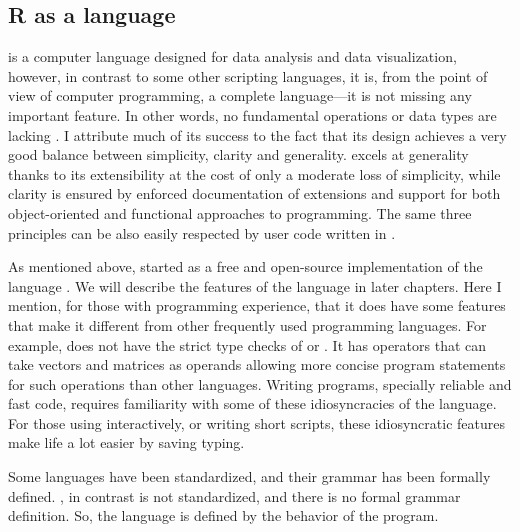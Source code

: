 \documentclass[krantz2]{krantz}\usepackage{knitr}
\begin{document}
\subsection{R as a language}
\Rlang is a computer language designed for data analysis and data visualization, however, in contrast to some other scripting languages, it is, from the point of view of computer programming, a complete language---it is not missing any important feature. In other words, no fundamental operations or data types are lacking \autocite{Chambers2016}. I attribute much of its success to the fact that its design achieves a very good balance between simplicity, clarity and generality. \Rlang excels at generality thanks to its extensibility at the cost of only a moderate loss of simplicity, while clarity is ensured by enforced documentation of extensions and support for both object-oriented and functional approaches to programming. The same three principles can be also easily respected by user code written in \Rlang.

As mentioned above, \Rlang started as a free and open-source implementation of the \Slang language \autocite{Becker1984,Becker1988}. We will describe the features of the \Rlang language in later chapters. Here I mention, for those with programming experience, that it does have some features that make it different from other frequently used programming languages. For example, \Rlang does not have the strict type checks of  or  \Cpplang. It has operators that can take vectors and matrices as operands allowing more concise program statements for such operations than other languages. Writing programs, specially reliable and fast code, requires familiarity with some of these idiosyncracies of the \Rlang language. For those using \Rpgrm interactively, or writing short scripts, these idiosyncratic features make life a lot easier by saving typing.

\begin{explainbox}
Some languages have been standardized, and their grammar has been formally defined. \Rlang, in contrast is not standardized, and there is no formal grammar definition. So, the \Rlang language is defined by the behavior of the \Rpgrm program.
\end{explainbox}
\end{document}
